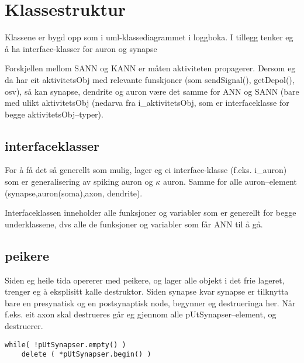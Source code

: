 
\section{Klassestruktur}
Klassene er bygd opp som i uml-klassediagrammet i loggboka. I tillegg tenker eg å ha interface-klasser for auron og synapse

Forskjellen mellom SANN og KANN er måten aktiviteten propagerer. Dersom eg da har eit aktivitetsObj med relevante funskjoner (som sendSignal(), getDepol(), osv), så kan synapse, dendrite og auron være det samme for ANN og SANN (bare med ulikt aktivitetsObj (nedarva fra i\_aktivitetsObj, som er interfaceklasse for begge aktivitetsObj--typer).


\subsection{interfaceklasser}
For å få det så generellt som mulig, lager eg ei interface-klasse (f.eks. i\_auron) som er generalisering av spiking auron og $\kappa$ auron. Samme for alle auron--element (synapse,auron(soma),axon, dendrite).

Interfaceklassen inneholder alle funksjoner og variabler som er generellt for begge underklassene, dvs alle de funksjoner og variabler som får ANN til å gå.





\subsection{peikere}
Siden eg heile tida opererer med peikere, og lager alle objekt i det frie lageret, trenger eg å eksplisitt kalle destruktor.
Siden synapse kvar synapse er tilknytta bare en presynatisk og en postsynaptisk node, begynner eg destrueringa her. Når f.eks. eit axon skal destrueres går eg gjennom alle pUtSynapser--element, og destruerer.
\begin{lstlisting}
while( !pUtSynapser.empty() )
	delete ( *pUtSynapser.begin() )
\end{lstlisting}
